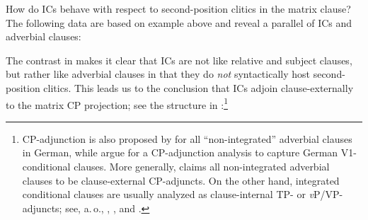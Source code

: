 \documentclass[output=paper,colorlinks,citecolor=brown,
modfonts,newtxmath
]{langscibook}
\begin{document}
\ea\label{ex:Adverbialsatz}
\z
\z

\noindent How do ICs behave with respect to second-position clitics in the matrix clause? The following data are based on example  above and reveal a parallel of ICs and adverbial clauses:

\ea\label{ex:father2}
\z
\z

\noindent The contrast in  makes it clear that ICs are not like relative and subject clauses, but rather like adverbial clauses in that they do \textit{not} syntactically host second-position clitics. This leads us to the conclusion that ICs adjoin clause-externally to the matrix CP projection; see the structure in :\footnote{CP-adjunction is also proposed by \citet[138]{Reis1997} for all ``non-integrated'' adverbial clauses in German, while \citet[167\,ff]{ReisWoellstein2010} argue for a CP-adjunction analysis to capture German V1-conditional clauses. More generally, \citet[71]{Haegeman2004} claims all non-integrated adverbial clauses to be clause-external CP-adjuncts. On the other hand, integrated conditional clauses are usually analyzed as clause-internal TP- or \textit{v}P/VP-adjuncts; see, a.\,o., \citet[138]{Reis1997}, \citet[144--145,\,168]{ReisWoellstein2010}, and \citet[647]{BhattPancheva2006}.}
\end{document}
